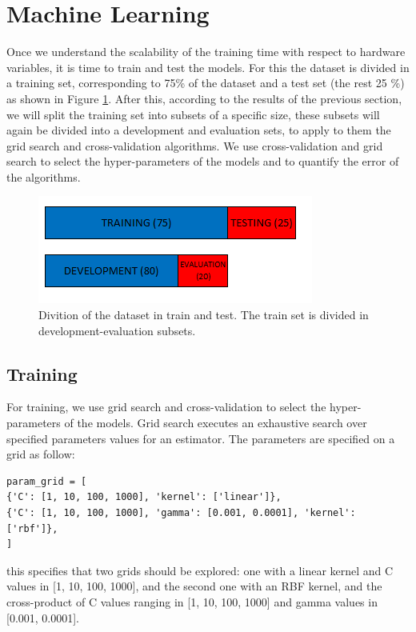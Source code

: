 \section{Machine Learning}
Once we understand the scalability of the training time with respect to hardware variables, it is time to train and test the models. For this the dataset is divided in a training set, corresponding to 75\% of the dataset and a test set (the rest 25 \%) as shown in Figure \ref{fig:metho3}. After this, according to the results of the previous section, we will split the training set into subsets of a specific size, these subsets will again be divided into a development and evaluation sets, to apply to them the grid search and cross-validation algorithms. We use cross-validation and grid search to select the hyper-parameters of the models and to quantify the error of the algorithms. 
\begin{figure}[h!]
	\centering
	\includegraphics[width=0.6\linewidth]{TeX_files/Imagenes/metho_3}
	\caption{Divition of the dataset in train and test. The train set is divided in development-evaluation subsets.}
	\label{fig:metho3}
\end{figure}
\subsection{Training}
For training, we use grid search and cross-validation to select the hyper-parameters of the models. Grid search executes an exhaustive search over specified parameters values for an estimator. The parameters are specified on a grid as follow:
\begin{verbatim}
param_grid = [
{'C': [1, 10, 100, 1000], 'kernel': ['linear']},
{'C': [1, 10, 100, 1000], 'gamma': [0.001, 0.0001], 'kernel': ['rbf']},
]
\end{verbatim}
this specifies that two grids should be explored: one with a linear kernel and C values in [1, 10, 100, 1000], and the second one with an RBF kernel, and the cross-product of C values ranging in [1, 10, 100, 1000] and gamma values in [0.001, 0.0001].

